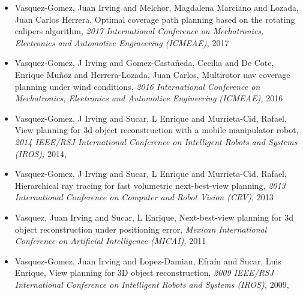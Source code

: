 \begin{itemize}
\item Vasquez-Gomez, Juan Irving and Melchor, Magdalena Marciano and Lozada, Juan Carlos Herrera, Optimal coverage path planning based on the rotating calipers algorithm, \textit{ 2017 International Conference on Mechatronics, Electronics and Automotive Engineering (ICMEAE),} 2017 
\item Vasquez-Gomez, J Irving and Gomez-Casta{\~n}eda, Cecilia and De Cote, Enrique Mu{\~n}oz and Herrera-Lozada, Juan Carlos, Multirotor uav coverage planning under wind conditions, \textit{ 2016 International Conference on Mechatronics, Electronics and Automotive Engineering (ICMEAE),} 2016 
\item Vasquez-Gomez, J Irving and Sucar, L Enrique and Murrieta-Cid, Rafael, View planning for 3d object reconstruction with a mobile manipulator robot, \textit{ 2014 IEEE/RSJ International Conference on Intelligent Robots and Systems (IROS),} 2014, \href{https://doi.org/10.1109/IROS.2014.6943158} {\faFilePdfO} 
\item Vasquez-Gomez, J Irving and Sucar, L Enrique and Murrieta-Cid, Rafael, Hierarchical ray tracing for fast volumetric next-best-view planning, \textit{ 2013 International Conference on Computer and Robot Vision (CRV),} 2013 
\item Vasquez, Juan Irving and Sucar, L Enrique, Next-best-view planning for 3d object reconstruction under positioning error, \textit{ Mexican International Conference on Artificial Intelligence (MICAI),} 2011 
\item Vasquez-Gomez, Juan Irving and Lopez-Damian, Efraín and Sucar, Luis Enrique, View planning for 3D object reconstruction, \textit{ 2009 IEEE/RSJ International Conference on Intelligent Robots and Systems (IROS),} 2009, \href{https://doi.org/10.1109/IROS.2009.5354383} {\faFilePdfO} 
\end{itemize} 
